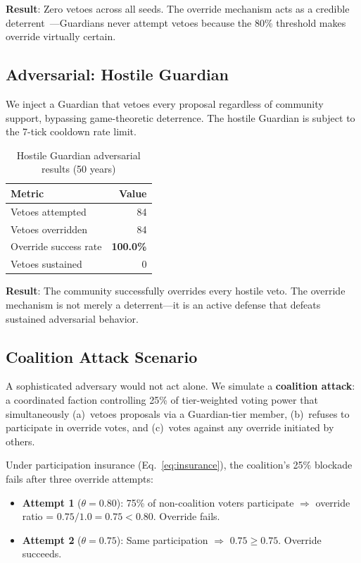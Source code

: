 \documentclass[11pt,a4paper]{article}
\begin{document}
\noindent\textbf{Result}: Zero vetoes across all seeds. The override mechanism acts as a credible deterrent~\cite{schelling}---Guardians never attempt vetoes because the 80\% threshold makes override virtually certain.

\subsection{Adversarial: Hostile Guardian}

We inject a Guardian that vetoes every proposal regardless of community support, bypassing game-theoretic deterrence. The hostile Guardian is subject to the 7-tick cooldown rate limit.

\begin{table}[h]
\centering
\caption{Hostile Guardian adversarial results (50 years)}
\label{tab:hostile}
\begin{tabular}{lr}
\toprule
\textbf{Metric} & \textbf{Value} \\
\midrule
Vetoes attempted & 84 \\
Vetoes overridden & 84 \\
Override success rate & \textbf{100.0\%} \\
Vetoes sustained & 0 \\
\bottomrule
\end{tabular}
\end{table}

\noindent\textbf{Result}: The community successfully overrides every hostile veto. The override mechanism is not merely a deterrent---it is an active defense that defeats sustained adversarial behavior.

\subsection{Coalition Attack Scenario}

A sophisticated adversary would not act alone. We simulate a \textbf{coalition attack}: a coordinated faction controlling 25\% of tier-weighted voting power that simultaneously (a)~vetoes proposals via a Guardian-tier member, (b)~refuses to participate in override votes, and (c)~votes against any override initiated by others.

Under participation insurance (Eq.~\ref{eq:insurance}), the coalition's 25\% blockade fails after three override attempts:

\begin{itemize}
    \item \textbf{Attempt 1} ($\theta = 0.80$): 75\% of non-coalition voters participate $\Rightarrow$ override ratio = $0.75/1.0 = 0.75 < 0.80$. Override fails.
    \item \textbf{Attempt 2} ($\theta = 0.75$): Same participation $\Rightarrow$ $0.75 \geq 0.75$. Override succeeds.
\end{itemize}
\end{document}
